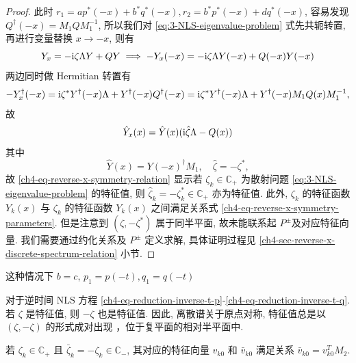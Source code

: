 \begin{proof}
    此时 $ r_{1} = a p^{*}(-x) + b^{*} q^{*}(-x), r_{2} = b^{*} p^{*}(-x) + d q^{*}(-x) $, 容易发现 $ Q^{\dagger}(-x) = M_{1} Q M_{1}^{-1} $, 所以我们对 \eqref{eq:3-NLS-eigenvalue-problem} 式先共轭转置, 再进行变量替换 $ x \to -x $, 则有
    \begin{equation}
        Y_{x} = - \mathrm{i} \zeta \Lambda Y + Q Y \implies -Y_{x}(-x)  = - \mathrm{i} \zeta \Lambda Y(-x) + Q(-x) Y(-x)
    \end{equation}
    两边同时做 Hermitian 转置有
    \begin{equation}
        -Y_{x}^{\dagger}(-x) = \mathrm{i} \zeta^{*} Y^{\dagger}(-x) \Lambda + Y^{\dagger}(-x) Q^{\dagger}(-x)
        =\mathrm{i} \zeta^{*} Y^{\dagger}(-x)\Lambda + Y^{\dagger}(-x) M_{1} Q(x) M_{1}^{-1},
    \end{equation}
    故
    \begin{equation}
        \hat{Y}_{x}(x) = \hat{Y}(x) (\mathrm{i} \hat{\zeta} \Lambda - Q(x)) \label{ch4-eq-reverse-x-symmetry-relation}
    \end{equation}
    其中
    \begin{equation}
        \hat{Y}(x) = Y(-x)^{\dagger}M_{1}, \quad \hat{\zeta} = -\zeta^{*}, \label{ch4-eq-reverse-x-symmetry-parameters}
    \end{equation}
    故 \eqref{ch4-eq-reverse-x-symmetry-relation} 显示若 $ \zeta_{k} \in \mathbb{C}_{+} $ 为散射问题 \eqref{eq:3-NLS-eigenvalue-problem} 的特征值, 则 $ \hat{\zeta}_{k} = -\zeta_{k}^{*} \in \mathbb{C}_{+} $ 亦为特征值. 此外, $\zeta_{k}$ 的特征函数 $ Y_{k}(x) $ 与 $\zeta_{k}$ 的特征函数 $ Y_{k}(x) $ 之间满足关系式 \eqref{ch4-eq-reverse-x-symmetry-parameters}.
    但是注意到 $(\zeta, -\zeta^{*})$ 属于同半平面, 故未能联系起 $P^{\pm}$及对应特征向量. 我们需要通过约化关系及 $P^{\pm}$ 定义求解, 具体证明过程见 \ref{ch4-sec-reverse-x-discrete-spectrum-relation} 小节.
\end{proof}
\begin{theorem}[逆时间] \label{ch4-thm:inverse-time}
    这种情况下 $ b = c $, $ p_{1}=p(-t), q_{1} = q(-t) $

    对于逆时间 NLS 方程 \eqref{ch4-eq-reduction-inverse-t-p}-\eqref{ch4-eq-reduction-inverse-t-q}. 若 $ \zeta $ 是特征值, 则 $ -\zeta $ 也是特征值. 因此, 离散谱关于原点对称, 特征值总是以 $(\zeta, -\zeta)$ 的形式成对出现 ，位于复平面的相对半平面中.

    若 $ \zeta_{k} \in \mathbb{C}_{+} $ 且 $ \bar{\zeta}_{k} = -\zeta_{k} \in \mathbb{C}_{-} $, 其对应的特征向量 $ v_{k0} $ 和 $ \bar{v}_{k0} $ 满足关系 $ \bar{v}_{k0} = v_{k0}^{T}M_{2} $.
\end{theorem}
